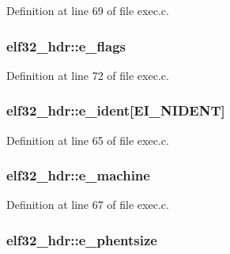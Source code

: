 Definition at line 69 of file exec.\+c.

\hypertarget{structelf32__hdr_a8695845266a8825d6cc9c04205c783f5}{
\subsubsection[{e\+\_\+flags}]{ elf32\+\_\+hdr\+::e\+\_\+flags}}\label{structelf32__hdr_a8695845266a8825d6cc9c04205c783f5}


Definition at line 72 of file exec.\+c.

\hypertarget{structelf32__hdr_a47cad02c87b35eab4d8fda5f3f0fefd4}{
\subsubsection[{e\+\_\+ident}]{ elf32\+\_\+hdr\+::e\+\_\+ident\mbox{[}{\bf E\+I\+\_\+\+N\+I\+D\+E\+N\+T}\mbox{]}}}\label{structelf32__hdr_a47cad02c87b35eab4d8fda5f3f0fefd4}


Definition at line 65 of file exec.\+c.

\hypertarget{structelf32__hdr_ac683164e0380f6babe3f46a3a1ffdfe9}{
\subsubsection[{e\+\_\+machine}]{ elf32\+\_\+hdr\+::e\+\_\+machine}}\label{structelf32__hdr_ac683164e0380f6babe3f46a3a1ffdfe9}


Definition at line 67 of file exec.\+c.

\hypertarget{structelf32__hdr_a7c8f7ea4bb2789905be6dc875c1e502d}{
\subsubsection[{e\+\_\+phentsize}]{ elf32\+\_\+hdr\+::e\+\_\+phentsize}}\label{structelf32__hdr_a7c8f7ea4bb2789905be6dc875c1e502d}


